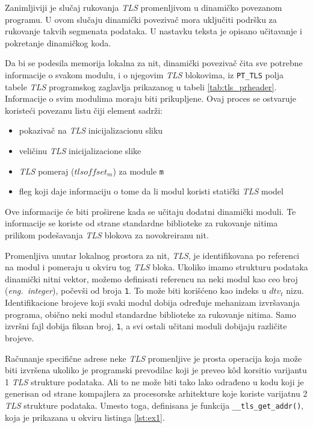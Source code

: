 \documentclass[12pt,oneside]{memoir}
\begin{document}
Zanimljiviji je slučaj rukovanja \emph{TLS} promenljivom u dinamičko povezanom programu. U ovom slučaju dinamički povezivač mora uključiti podršku za rukovanje takvih segmenata podataka. U nastavku teksta je opisano učitavanje i pokretanje dinamičkog koda.

Da bi se podesila memorija lokalna za nit, dinamički povezivač čita sve potrebne informacije o svakom modulu, i o njegovim \emph{TLS} blokovima, iz \texttt{PT\_TLS} polja tabele \emph{TLS} programskog zaglavlja prikazanog u tabeli \ref{tab:tls_prheader}. Informacije o svim modulima moraju biti prikupljene. Ovaj proces se ostvaruje koristeći povezanu listu čiji element sadrži:

\begin{itemize}
	\item pokazivač na \emph{TLS} inicijalizacionu sliku
	\item veličinu \emph{TLS} inicijalizacione slike
	\item \emph{TLS} pomeraj (\texttt{$tlsoffset_m$}) za module \texttt{m}
	\item fleg koji daje informaciju o tome da li modul koristi statički \emph{TLS} model
\end{itemize}

Ove informacije će biti proširene kada se učitaju dodatni dinamički moduli. Te informacije se koriste od strane standardne biblioteke za rukovanje nitima prilikom podešavanja \emph{TLS} blokova za novokreiranu nit.

Promenljiva unutar lokalnog prostora za nit, \emph{TLS}, je identifikovana po referenci na modul i pomeraju u okviru tog \emph{TLS} bloka. Ukoliko imamo strukturu podataka dinamički nitni vektor, možemo definisati referencu na neki modul kao ceo broj (\emph{eng.~integer}), počevši od broja \texttt{1}. To može biti korišćeno kao indeks u \texttt{$dtv_t$} nizu. Identifikacione brojeve koji svaki modul dobija određuje mehanizam izvršavanja programa, obično neki modul standardne biblioteke za rukovanje nitima. Samo izvršni fajl dobija fiksan broj, \texttt{1}, a svi ostali učitani moduli dobijaju različite brojeve.

Računanje specifične adrese neke \emph{TLS} promenljive je prosta operacija koja može biti izvršena ukoliko je programski prevodilac koji je preveo k\^{o}d korsitio varijantu 1 \emph{TLS} strukture podataka. Ali to ne može biti tako lako odrađeno u kodu koji je generisan od strane kompajlera za procesorske arhitekture koje koriste varijatnu 2 \emph{TLS} strukture podataka.
Umesto toga, definisana je funkcija \texttt{\_\_tls\_get\_addr()}, koja je prikazana u okviru listinga \ref{lst:ex1}.
\end{document}
